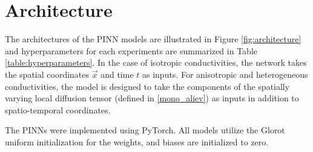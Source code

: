 \section{Architecture}\label{architecture}


The architectures of the PINN models are illustrated in Figure \ref{fig:architecture} and hyperparameters for each experiments are summarized in Table \ref{table:hyperparameters}. In the case of isotropic conductivities, the network takes the spatial coordinates \( \vec{x} \) and time \( t \) as inputs.
For anisotropic and heterogeneous conductivities, the model is designed to take the components of the spatially varying local diffusion tensor (defined in \ref{mono_aliev}) as inputs in addition to spatio-temporal coordinates.

The PINNs were implemented using PyTorch\cite{pytorch}. All models utilize the Glorot uniform initialization \cite{glorot} for the weights, and biases are initialized to zero.

